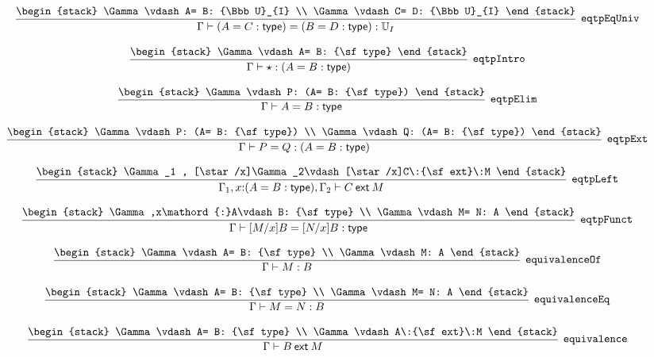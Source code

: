 \[
\infer[{\tt eqtpEqUniv}]{\Gamma \vdash (A= C: {\sf type})= (B= D: {\sf type}): {\Bbb U}_{I}}{
\begin{stack}
\Gamma \vdash A= B: {\Bbb U}_{I}
\\
\Gamma \vdash C= D: {\Bbb U}_{I}
\end{stack}}
\]

\[
\infer[{\tt eqtpIntro}]{\Gamma \vdash \star : (A= B: {\sf type})}{
\begin{stack}
\Gamma \vdash A= B: {\sf type}
\end{stack}}
\]

\[
\infer[{\tt eqtpElim}]{\Gamma \vdash A= B: {\sf type}}{
\begin{stack}
\Gamma \vdash P: (A= B: {\sf type})
\end{stack}}
\]

\[
\infer[{\tt eqtpExt}]{\Gamma \vdash P= Q: (A= B: {\sf type})}{
\begin{stack}
\Gamma \vdash P: (A= B: {\sf type})
\\
\Gamma \vdash Q: (A= B: {\sf type})
\end{stack}}
\]

\[
\infer[{\tt eqtpLeft}]{\Gamma_1 ,x\mathord{:}(A= B: {\sf type}), \Gamma_2 \vdash C\:{\sf ext}\:M}{
\begin{stack}
\Gamma_1 , [\star /x]\Gamma_2\vdash [\star /x]C\:{\sf ext}\:M
\end{stack}}
\]

\[
\infer[{\tt eqtpFunct}]{\Gamma \vdash [M/x]B= [N/x]B: {\sf type}}{
\begin{stack}
\Gamma ,x\mathord{:}A\vdash B: {\sf type}
\\
\Gamma \vdash M= N: A
\end{stack}}
\]

\[
\infer[{\tt equivalenceOf}]{\Gamma \vdash M: B}{
\begin{stack}
\Gamma \vdash A= B: {\sf type}
\\
\Gamma \vdash M: A
\end{stack}}
\]

\[
\infer[{\tt equivalenceEq}]{\Gamma \vdash M= N: B}{
\begin{stack}
\Gamma \vdash A= B: {\sf type}
\\
\Gamma \vdash M= N: A
\end{stack}}
\]

\[
\infer[{\tt equivalence}]{\Gamma \vdash B\:{\sf ext}\:M}{
\begin{stack}
\Gamma \vdash A= B: {\sf type}
\\
\Gamma \vdash A\:{\sf ext}\:M
\end{stack}}
\]

